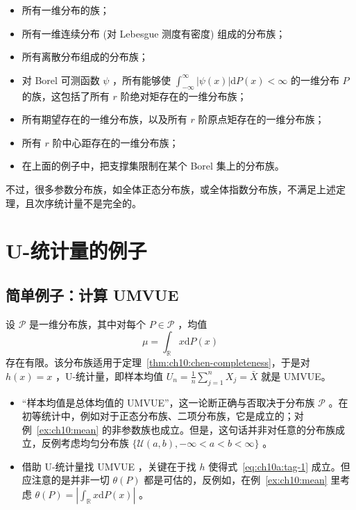 \begin{itemize}
\tightlist
\item
  所有一维分布的族；
\item
  所有一维连续分布 (对 Lebesgue 测度有密度) 组成的分布族；
\item
  所有离散分布组成的分布族；
\item
  对 Borel 可测函数 $\psi$ ，所有能够使 $\int_{-\infty}^\infty|\psi(x)|\mathrm{d}P(x)<\infty$ 的一维分布 $P$ 的族，这包括了所有 $r$ 阶绝对矩存在的一维分布族；
\item
  所有期望存在的一维分布族，以及所有 $r$ 阶原点矩存在的一维分布族；
\item
  所有 $r$ 阶中心距存在的一维分布族；
\item
  在上面的例子中，把支撑集限制在某个 Borel 集上的分布族。
\end{itemize}

不过，很多参数分布族，如全体正态分布族，或全体指数分布族，不满足上述定理，且次序统计量不是完全的。





\section{U-统计量的例子}

\subsection{简单例子：计算 UMVUE}

\begin{example}[均值]\label{ex:ch10:mean}
设 $\mathscr P$ 是一维分布族，其中对每个 $P\in\mathscr P$ ，均值 $$\mu=\int_{\mathbb R}x\mathrm dP(x)$$
存在有限。该分布族适用于定理~\ref{thm:ch10:chen-completeness}，于是对 $h(x)=x$ ，U-统计量，即样本均值 $U_n=\frac1n\sum_{j=1}^nX_j=\bar X$ 就是 UMVUE。

\begin{remark}

\begin{itemize}
\tightlist
\item
  ``样本均值是总体均值的 UMVUE''，这一论断正确与否取决于分布族 $\mathscr P$ 。在初等统计中，例如对于正态分布族、二项分布族，它是成立的；对例~\ref{ex:ch10:mean} 的非参数族也成立。但是，这句话并非对任意的分布族成立，反例考虑均匀分布族 $\{\mathcal U(a,b),-\infty<a<b<\infty\}$ 。
\item
  借助 U-统计量找 UMVUE ，关键在于找 $h$ 使得式~\eqref{eq:ch10a:tag-1} 成立。但应注意的是并非一切 $\theta(P)$ 都是可估的，反例如，在例~\ref{ex:ch10:mean} 里考虑 $\theta(P)=\left|\int_{\mathbb R}x\mathrm dP(x)\right|$ 。
\end{itemize}
\end{remark}

\end{example}

